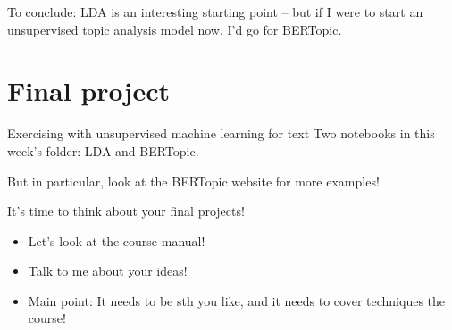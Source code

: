 \documentclass[compress]{beamer}
\begin{document}
	
	\begin{frame}[standout]
	To conclude: LDA is an interesting starting point -- but if I were to start an unsupervised topic analysis model now, I'd go for BERTopic.
	
	\end{frame}
	
	

\section{Final project}
\begin{frame}{Exercising with unsupervised machine learning for text}
Two notebooks in this week's folder: LDA and BERTopic.

But in particular, look at the BERTopic website for more examples!
\end{frame}


\begin{frame}{It's time to think about your final projects!}
\begin{itemize}
\item Let's look at the course manual!
\item Talk to me about your ideas!
\item Main point: It needs to be sth you like, and it needs to cover techniques the course!
\end{itemize}
\end{frame}

\begin{frame}
	\printbibliography
\end{frame}
\end{document}
